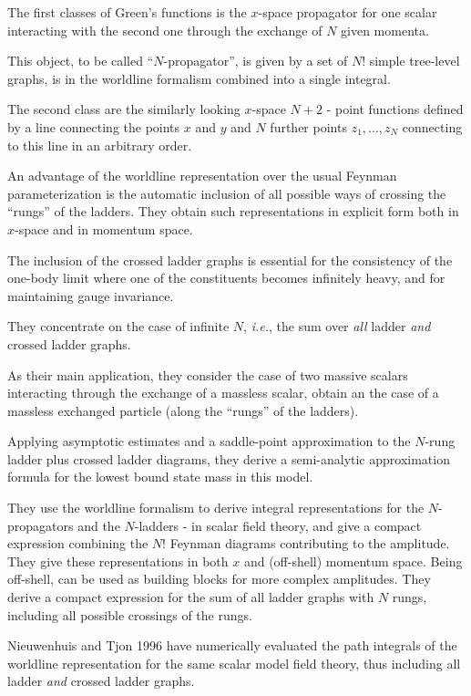 \begin{description}
The first classes of Green's functions %
is the
$x$-space propagator for one scalar interacting with the second one
through the exchange of $N$ given momenta.

This object, to be called ``$N$-propagator'', is given by a set of $N!$
simple tree-level graphs, is in the worldline formalism combined into a
single integral.

The second class are the similarly looking  $x$-space $N+2$ - point
functions %
defined by a line connecting
the points $x$ and $y$ and $N$ further points $z_1,\ldots,z_N$ connecting
to this line in an arbitrary order.

An advantage of the worldline representation over the usual Feynman
parameterization is the automatic inclusion of all possible ways of
crossing the ``rungs'' of the ladders. They obtain such representations
in explicit form both in $x$-space and in momentum space.

The inclusion of the crossed ladder graphs is essential for the
consistency of the one-body limit where one of the constituents becomes
infinitely heavy, and for maintaining gauge invariance.

They concentrate on the case of infinite $N$, \hbox{\it i.e.}, the sum
over {\it all} ladder {\it and} crossed ladder graphs.

As their main application, they consider the case of two massive scalars
interacting through the exchange of a massless scalar, obtain an the case
of a massless exchanged particle (along the ``rungs'' of the ladders).

Applying
asymptotic estimates and a saddle-point approximation to the $N$-rung
ladder plus crossed ladder diagrams, they derive a semi-analytic
approximation formula for the lowest bound state mass in this model.

They use the worldline formalism to derive integral representations for
the $N$-propagators and the $N$-ladders - in scalar field theory,
and give a compact expression combining the $N!$ Feynman diagrams
contributing to the amplitude. They give these representations in both
$x$ and (off-shell) momentum space. Being off-shell, can be used
as building blocks for more complex amplitudes. They derive a
compact expression for the sum of all ladder graphs with $N$ rungs,
including all possible crossings of the rungs.

Nieuwenhuis and Tjon 1996 have numerically evaluated the path
integrals of the worldline representation for the same scalar model field
theory, thus including all ladder {\it and}
crossed ladder graphs.


\end{description}
